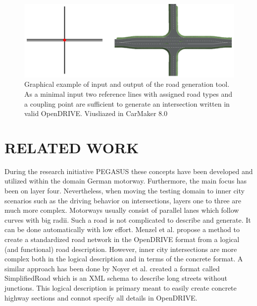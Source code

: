 \documentclass[a4paper, 10pt, conference]{ieeeconf}      %
\begin{document}
\begin{figure}[tpb] 		
	\centering
	\includegraphics{fig/motivation.png}
	\caption[dummy]{Graphical example of input and output of the road generation tool. As a minimal input two reference lines with assigned road types and a coupling point are sufficient to generate an intersection written in valid OpenDRIVE. Viusliazed in CarMaker 8.0\footnotemark}
	\label{fig_motivation}
\end{figure}
\section{RELATED WORK}
During the research initiative PEGASUS \cite{pegasus.2019} these concepts have been developed and utilized within the domain German motorway. Furthermore, the main focus has been on layer four. Nevertheless, when moving the testing domain to inner city scenarios such as the driving behavior on intersections, layers one to three are much more complex. Motorways usually consist of parallel lanes which follow curves with big radii. Such a road is not complicated to describe and generate. It can be done automatically with low effort. Menzel et al. \cite{menzel2019functional} propose a method to create a standardized road network in the OpenDRIVE format from a logical (and functional) road description. However, inner city intersections are more complex both in the logical description and in terms of the concrete format. 
A similar approach has been done by Noyer et al. \cite{dlrODRgen} created a format called SimplifiedRoad which is an XML schema to describe long streets without junctions. This logical description is primary meant to easily create concrete highway sections and connot specify all details in OpenDRIVE.
\end{document}
